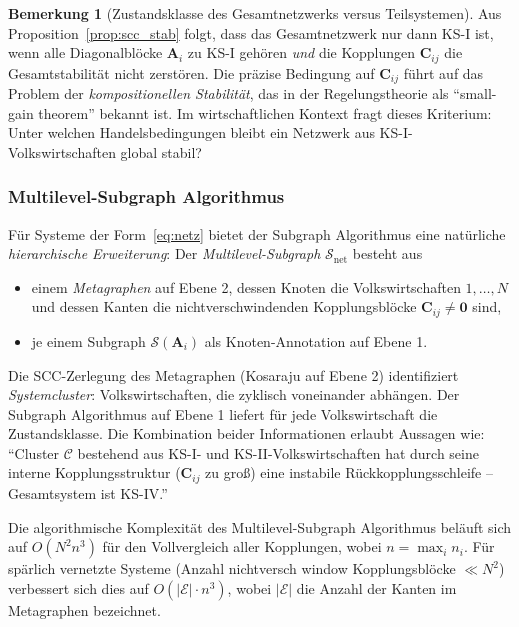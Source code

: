 \documentclass[a4paper, 12pt, twoside, openright]{report}
\theoremstyle{definition}
\newtheorem{remark}[theorem]{Bemerkung}
\theoremstyle{definition}
\newcommand{\vA}{\bm{A}}
\newcommand{\vC}{\bm{C}}
\begin{document}
\begin{remark}[Zustandsklasse des Gesamtnetzwerks versus Teilsystemen]
Aus Proposition~\ref{prop:scc_stab} folgt, dass das Gesamtnetzwerk nur dann KS-I ist,
wenn alle Diagonalblöcke $\vA_i$ zu KS-I gehören \emph{und} die Kopplungen $\vC_{ij}$
die Gesamtstabilität nicht zerstören. Die präzise Bedingung auf $\vC_{ij}$ führt auf
das Problem der \emph{kompositionellen Stabilität}, das in der Regelungstheorie als
``small-gain theorem'' bekannt ist. Im wirtschaftlichen Kontext fragt dieses Kriterium:
Unter welchen Handelsbedingungen bleibt ein Netzwerk aus KS-I-Volkswirtschaften global stabil?
\end{remark}

\subsubsection*{Multilevel-Subgraph Algorithmus}

Für Systeme der Form~\eqref{eq:netz} bietet der Subgraph Algorithmus eine natürliche
\emph{hierarchische Erweiterung}: Der \emph{Multilevel-Subgraph} $\mathcal{S}_{\mathrm{net}}$
besteht aus
\begin{itemize}
  \item einem \emph{Metagraphen} auf Ebene 2, dessen Knoten die Volkswirtschaften
    $1, \ldots, N$ und dessen Kanten die nichtver\-schwindenden Kopplungsblöcke
    $\vC_{ij} \neq \bm{0}$ sind,
  \item je einem Subgraph $\mathcal{S}(\vA_i)$ als Knoten-Annotation auf Ebene 1.
\end{itemize}
Die SCC-Zerlegung des Metagraphen (Kosaraju auf Ebene 2) identifiziert
\emph{Systemcluster}: Volkswirtschaften, die zyklisch voneinander abhängen. Der
Subgraph Algorithmus auf Ebene 1 liefert für jede Volkswirtschaft die Zustandsklasse.
Die Kombination beider Informationen erlaubt Aussagen wie: ``Cluster $\mathcal{C}$
bestehend aus KS-I- und KS-II-Volkswirtschaften hat durch seine interne Kopplungsstruktur
($\vC_{ij}$ zu groß) eine instabile Rückkopplungsschleife -- Gesamtsystem ist KS-IV.''

Die algorithmische Komplexität des Multilevel-Subgraph Algorithmus beläuft sich auf
$O(N^2 n^3)$ für den Vollvergleich aller Kopplungen, wobei $n = \max_i n_i$.
Für spärlich vernetzte Systeme (Anzahl nichtversch window Kopplungsblöcke $\ll N^2$)
verbessert sich dies auf $O(|\mathcal{E}| \cdot n^3)$, wobei $|\mathcal{E}|$ die
Anzahl der Kanten im Metagraphen bezeichnet.

\end{document}
